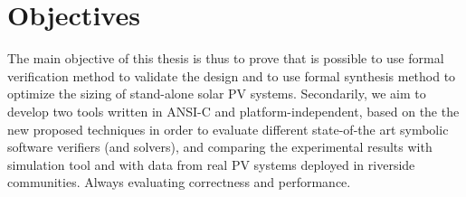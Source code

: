 \section{Objectives}

The main objective of this thesis is thus to prove that is possible to use formal verification method to validate the design and to use formal synthesis method to optimize the sizing of stand-alone solar PV systems. Secondarily, we aim to develop two tools written in ANSI-C and platform-independent, based on the the new proposed techniques in order to evaluate different state-of-the art symbolic software verifiers (and solvers), and comparing the experimental results with simulation tool and with data from real PV systems deployed in riverside communities. Always evaluating correctness and performance.


